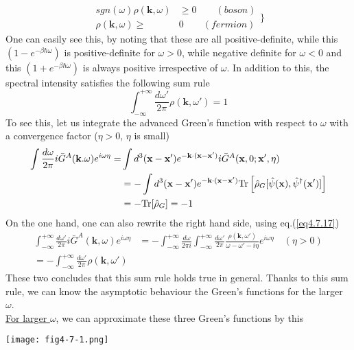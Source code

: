\begin{equation}
\begin{aligned}
sgn(\omega) \rho(\mathbf{k},\omega) &\ge 0 \qquad (boson)\\
\rho(\mathbf{k},\omega)\ge &0 \qquad (fermion)
\end{aligned}
\Big\}
\end{equation}
 One can easily see this, by noting that these are all positive-definite, while this $(1-e^{-\beta\hbar\omega})$ is positive-definite for $\omega>0$, while negative definite for $\omega<0$ and this $(1+e^{-\beta\hbar\omega})$ is always positive irrespective of $\omega$.
 In addition to this, the spectral intensity satisfies the following sum rule
\begin{equation}
\int_{-\infty}^{+\infty} \frac{d\omega'}{2\pi} \rho(\mathbf{k},\omega')=1
\end{equation}
 To see this, let us integrate the advanced Green's function with respect to $\omega$ with a convergence factor ($\eta>0$, $\eta$ is small)
\[
\begin{aligned}
\int \frac{d\omega}{2\pi} i\bar G ^A(\mathbf{k}.\omega) e^{i\omega\eta}=&\int d^3 (\mathbf{x}-\mathbf{x}') e^{-\mathbf{k}\cdot (\mathbf{x}-\mathbf{x}')} i\bar G^A(\mathbf{x},0;\mathbf{x}',\eta)\\
&=-\int d^3 (\mathbf{x}-\mathbf{x}') e^{-\mathbf{k}\cdot (\mathbf{x}-\mathbf{x}')} \text{Tr} \left[ \hat \rho_G [\hat \psi (\mathbf x),\hat \psi ^\dag (\mathbf x')] \right]\\
&=-\text{Tr} [\hat \rho _G]=-1
\end{aligned}
\]
On the one hand, one can also rewrite the right hand side, using eq.(\ref{eq4.7.17})
\[
\begin{aligned}
\int_{-\infty}^{+\infty} \frac{d\omega'}{2\pi} i\bar G^A(\mathbf{k},\omega) e^{i\omega\eta}&=-\int_{-\infty}^{+\infty} \frac{d\omega}{2\pi i} \int_{-\infty}^{+\infty} \frac{d\omega'}{2\pi} \frac{\rho(\mathbf{k},\omega')}{\omega-\omega'-i\eta} e^{i\omega\eta} \quad (\eta>0)\\
=-\int_{-\infty}^{+\infty} \frac{d\omega'}{2\pi} \rho(\mathbf{k},\omega')
\end{aligned}
\]
 These two concludes that this sum rule holds true in general.
 Thanks to this sum rule, we can know the asymptotic behaviour the Green's functions for the larger $\omega$.\\
\uline{For larger $\omega$}, we can approximate these three Green's functions by this 
\begin{center}
\texttt{[image: fig4-7-1.png]}
\end{center}
